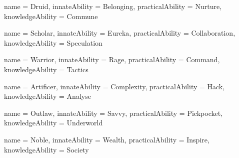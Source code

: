 \archetype
{
	name = Druid,
	innateAbility = Belonging,
	practicalAbility = Nurture,
	knowledgeAbility = Commune
}

\archetype
{
	name = Scholar,
	innateAbility = Eureka,
	practicalAbility = Collaboration,
	knowledgeAbility = Speculation
}

\archetype
{
	name = Warrior,
	innateAbility = Rage,
	practicalAbility = Command,
	knowledgeAbility = Tactics
}

\archetype
{
	name = Artificer,
	innateAbility = Complexity,
	practicalAbility = Hack,
	knowledgeAbility = Analyse
}

\archetype
{
	name = Outlaw,
	innateAbility = Savvy,
	practicalAbility = Pickpocket,
	knowledgeAbility = Underworld
}

\archetype
{
	name = Noble,
	innateAbility = Wealth,
	practicalAbility = Inspire,
	knowledgeAbility = Society
}


